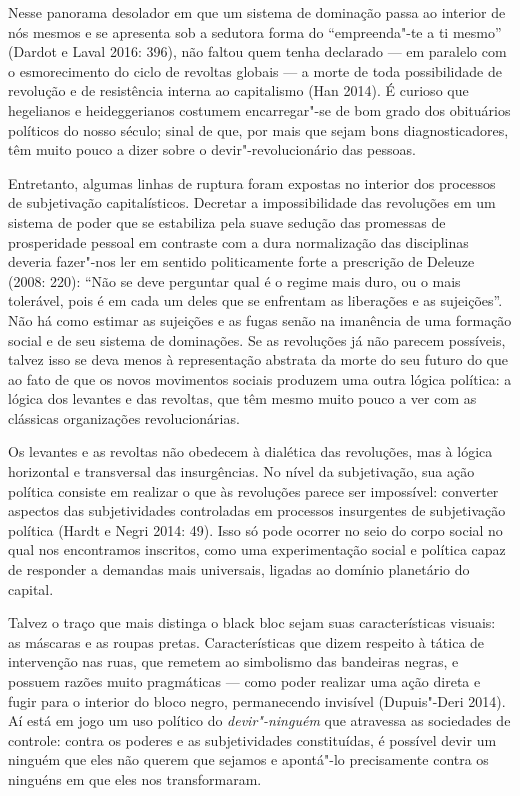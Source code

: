 Nesse panorama desolador em que um sistema de dominação passa ao
interior de nós mesmos e se apresenta sob a sedutora forma do
``empreenda"-te a ti mesmo'' (Dardot e Laval 2016: 396), não faltou quem
tenha declarado --- em paralelo com o esmorecimento do ciclo de revoltas
globais --- a morte de toda possibilidade de revolução e de resistência
interna ao capitalismo (Han 2014). É curioso que hegelianos e
heideggerianos costumem encarregar"-se de bom grado dos obituários
políticos do nosso século; sinal de que, por mais que sejam bons
diagnosticadores, têm muito pouco a dizer sobre o devir"-revolucionário
das pessoas.

Entretanto, algumas linhas de ruptura foram expostas no interior dos
processos de subjetivação capitalísticos. Decretar a impossibilidade das
revoluções em um sistema de poder que se estabiliza pela suave sedução
das promessas de prosperidade pessoal em contraste com a dura
normalização das disciplinas deveria fazer"-nos ler em sentido
politicamente forte a prescrição de Deleuze (2008: 220): ``Não se deve
perguntar qual é o regime mais duro, ou o mais tolerável, pois é em cada
um deles que se enfrentam as liberações e as sujeições''. Não há como
estimar as sujeições e as fugas senão na imanência de uma formação
social e de seu sistema de dominações. Se as revoluções já não parecem
possíveis, talvez isso se deva menos à representação abstrata da morte
do seu futuro do que ao fato de que os novos movimentos sociais produzem
uma outra lógica política: a lógica dos levantes e das revoltas, que têm
mesmo muito pouco a ver com as clássicas organizações revolucionárias.

Os levantes e as revoltas não obedecem à dialética das revoluções, mas à
lógica horizontal e transversal das insurgências. No nível da
subjetivação, sua ação política consiste em realizar o que às revoluções
parece ser impossível: converter aspectos das subjetividades controladas
em processos insurgentes de subjetivação política (Hardt e Negri 2014:
49). Isso só pode ocorrer no seio do corpo social no qual nos
encontramos inscritos, como uma experimentação social e política capaz
de responder a demandas mais universais, ligadas ao domínio planetário
do capital.

Talvez o traço que mais distinga o black bloc sejam suas
características visuais: as máscaras e as roupas pretas. Características
que dizem respeito à tática de intervenção nas ruas, que remetem ao
simbolismo das bandeiras negras, e possuem razões muito pragmáticas ---
como poder realizar uma ação direta e fugir para o interior do bloco
negro, permanecendo invisível (Dupuis"-Deri 2014). Aí está em jogo um uso
político do \emph{devir"-ninguém }que atravessa as sociedades de
controle: contra os poderes e as subjetividades constituídas, é possível
devir um ninguém que eles não querem que sejamos e apontá"-lo
precisamente contra os ninguéns em que eles nos transformaram.

